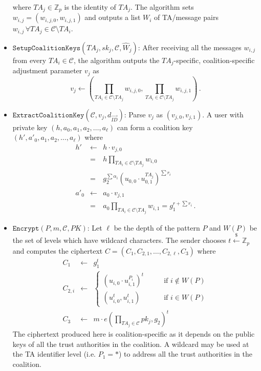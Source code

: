 \documentclass{IEEEtran}
\newcommand{\C}{\mathcal{C}}
\newcommand{\Zbb}{\mathbb{Z}}
\newcommand{\ID}{\mathit{ID}}
\newcommand{\TA}{\mathit{TA}}
\newcommand{\getsr}{\stackrel{{\scriptscriptstyle\$}}{\gets}}
\begin{document}
\begin{itemize}
where $\TA_{j} \in \Zbb_{p}$ is the identity of $\TA_{j}$. The
algorithm sets $w_{i,j}=(w_{i,j,0},w_{i,j,1})$ and outputs a
list $W_{i}$ of TA/message pairs $w_{i,j} \, \forall \TA_j \in
\C\setminus \TA_i$.\medskip

\item $\texttt{SetupCoalitionKeys}(\TA_j,sk_j, \C, \hat{W}_{j})$:
After receiving all the messages $w_{i,j}$ from every $\TA_i \in
\C$, the algorithm outputs the $\TA_j$-specific,
coalition-specific adjustment parameter $v_j$ as
\begin{displaymath}
    v_j \gets (\prod_{\TA_i \in \C \setminus \TA_j} w_{i,j,0},
    \prod_{\TA_i \in \C \setminus \TA_j} w_{i,j,1}) \, .
\end{displaymath}
\medskip

\item $\texttt{ExtractCoalitionKey}(\C,v_j,d_{\vec{\ID}})$:
Parse $v_j$ as $(v_{j,0}, v_{j,1})$. A user with private key
$(h,a_{0},a_{1},a_{2},\ldots,a_{\ell})$ can form a coalition key
$(h',a'_{0},a_{1},a_{2},\ldots,a_{\ell})$ where
\begin{eqnarray*}
    h' & \gets & h \cdot v_{j,0} \\
    & = & h \prod_{\TA_i \in \C \setminus \TA_j} w_{i,0} \\
    & = & g_{2}^{\sum \alpha_{i}}(u_{0,0} \cdot u_{0,1}^{\TA_j})^{\sum r_{i}} \\
    a'_{0} & \gets & a_{0} \cdot v_{j,1} \\
    & = & a_0 \prod_{\TA_i \in \C \setminus \TA_j} w_{i,1} = g_{1}^{r+\sum r_{i}} \, .
\end{eqnarray*}

\item $\texttt{Encrypt}(P,m, \C, PK)$:
Let $\ell$ be the depth of the pattern $P$ and $W(P)$ be the set
of levels which have wildcard characters. The sender chooses
$t\getsr \Zbb_{p}$ and computes the ciphertext
$C=(C_{1},C_{2,1},\ldots,C_{2,\ell},C_{3})$ where
\begin{eqnarray*}
    C_{1} & \gets & g_{1}^{t} \\
    C_{2,i} & \gets & \left\{
        \begin{array}{ll}
            (u_{i,0} \cdot u_{i,1}^{P_{i}})^{t} & \qquad \mbox{if } i \notin W(P) \\
            (u_{i,0}^{t},u_{i,1}^{t}) & \qquad \mbox{if } i \in W(P)
        \end{array}
    \right. \\
    C_{3} &\gets& m \cdot e(\prod_{\TA_{j}\in \C} pk_j,g_{2})^{t}
\end{eqnarray*}
The ciphertext produced here is coalition-specific as it depends
on the public keys of all the trust authorities in the
coalition. A wildcard may be used at the TA identifier level
(i.e. $P_{1} = *$) to address all the trust authorities in the
coalition.


\end{itemize}
\end{document}
